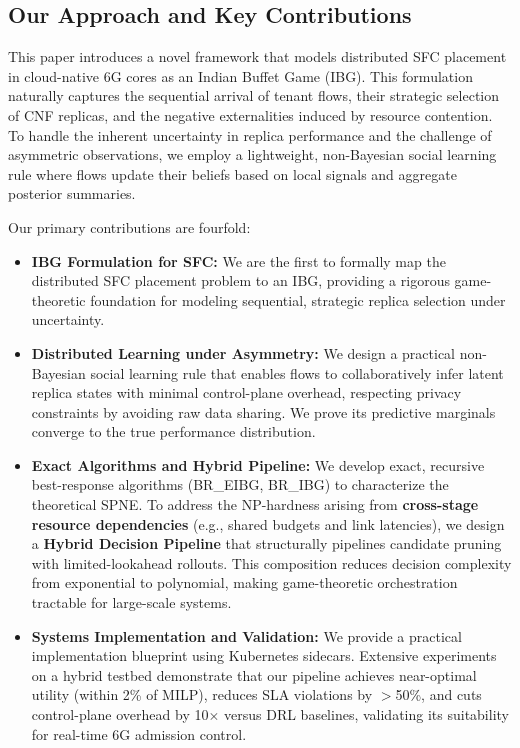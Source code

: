 \documentclass[journal]{IEEEtran}
\theoremstyle{plain}
\theoremstyle{definition}
\theoremstyle{remark}
\begin{document}
\subsection{Our Approach and Key Contributions}
\label{sec:intro_contributions}

This paper introduces a novel framework that models distributed SFC placement in cloud-native 6G cores as an Indian Buffet Game (IBG). This formulation naturally captures the sequential arrival of tenant flows, their strategic selection of CNF replicas, and the negative externalities induced by resource contention. To handle the inherent uncertainty in replica performance and the challenge of asymmetric observations, we employ a lightweight, non-Bayesian social learning rule where flows update their beliefs based on local signals and aggregate posterior summaries.

Our primary contributions are fourfold:
\begin{itemize}
    \item \textbf{IBG Formulation for SFC:} We are the first to formally map the distributed SFC placement problem to an IBG, providing a rigorous game-theoretic foundation for modeling sequential, strategic replica selection under uncertainty.
    
    \item \textbf{Distributed Learning under Asymmetry:} We design a practical non-Bayesian social learning rule that enables flows to collaboratively infer latent replica states with minimal control-plane overhead, respecting privacy constraints by avoiding raw data sharing. We prove its predictive marginals converge to the true performance distribution.
    
    \item \textbf{Exact Algorithms and Hybrid Pipeline:} We develop exact, recursive best-response algorithms (\textsf{BR\_EIBG}, \textsf{BR\_IBG}) to characterize the theoretical SPNE. To address the NP-hardness arising from \textbf{cross-stage resource dependencies} (e.g., shared budgets and link latencies), we design a \textbf{Hybrid Decision Pipeline} that structurally pipelines candidate pruning with limited-lookahead rollouts. This composition reduces decision complexity from exponential to polynomial, making game-theoretic orchestration tractable for large-scale systems.
    
    \item \textbf{Systems Implementation and Validation:} We provide a practical implementation blueprint using Kubernetes sidecars. Extensive experiments on a hybrid testbed demonstrate that our pipeline achieves near-optimal utility (within 2\% of MILP), reduces SLA violations by $>$50\%, and cuts control-plane overhead by 10$\times$ versus DRL baselines, validating its suitability for real-time 6G admission control.
\end{itemize}
\end{document}

